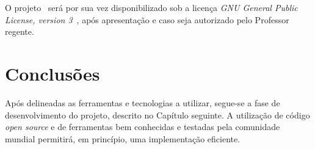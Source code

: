 O projeto \theapp~será por sua vez disponibilizado sob a licença \textit{GNU General Public License, version 3}~\cite{gnugpl3}, após apresentação e caso seja autorizado pelo Professor regente.


\section{Conclusões}
\label{sec::tecno:conclusao}

Após delineadas as ferramentas e tecnologias a utilizar, segue-se a fase de desenvolvimento do projeto, descrito no Capítulo seguinte. A utilização de código \textit{open source} e de ferramentas bem conhecidas e testadas pela comunidade mundial permitirá, em princípio, uma implementação eficiente.
